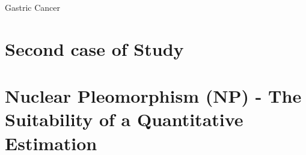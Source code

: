 \documentclass[usenames,dvipsnames]{beamer}
\begin{document}
\begin{frame}{Gastric Cancer }
\end{frame}
%  
%
%
%
%
%  
%
%		


\section{Second case of Study}

\section{ Nuclear Pleomorphism (NP) - The Suitability of a Quantitative Estimation}
\end{document}
